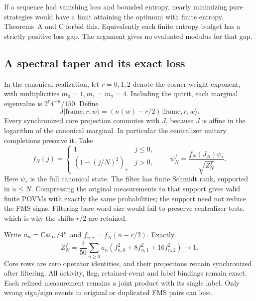If a sequence had vanishing loss and bounded entropy, nearly minimizing pure strategies would have a limit attaining the optimum with finite entropy. Theorems~A and C forbid this. Equivalently each finite entropy budget has a strictly positive loss gap. The argument gives no evaluated modulus for that gap.



\subsection{A spectral taper and its exact loss}
In the canonical realization, let $r=0,1,2$ denote the corner-weight exponent, with multiplicities $m_0=1,m_1=m_2=4$. Including the qutrit, each marginal eigenvalue is $2^r4^{-n}/150$. Define
\[
 J|\mathrm{frame},r,w\rangle=(n(w)-r/2)|\mathrm{frame},r,w\rangle.
\]
Every synchronized core projection commutes with $J$, because $J$ is affine in the logarithm of the canonical marginal. In particular the centralizer unitary completions preserve it. Take
\[
 f_N(j)=\begin{cases}1&j\leq0,\\(1-(j/N)^2)_+&j>0,\end{cases}
 \qquad \psi_N^f=\frac{f_N(J_A)\psi_*}{\sqrt{Z_N^f}}.
\]
Here $\psi_*$ is the full canonical state. The filter has finite Schmidt rank, supported in $n\leq N$. Compressing the original measurements to that support gives valid finite POVMs with exactly the same probabilities; the support need not reduce the FMS signs. Filtering bare word size would fail to preserve centralizer tests, which is why the shifts $r/2$ are retained.

Write $a_n=\operatorname{Cat}_n/4^n$ and $f_{n,r}=f_N(n-r/2)$. Exactly,
\begin{equation}\label{eq:Zf}
 Z_N^f=\frac1{50}\sum_{n\geq0}a_n
              (f_{n,0}^2+8f_{n,1}^2+16f_{n,2}^2)\longrightarrow1.
\end{equation}
Core rows are zero operator identities, and their projections remain synchronized after filtering. All activity, flag, retained-event and label bindings remain exact. Each refined measurement remains a joint product with its single label. Only wrong sign/sign events in original or duplicated FMS pairs can lose.

